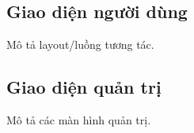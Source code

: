 
\subsection{Giao diện người dùng}
Mô tả layout/luồng tương tác.

\subsection{Giao diện quản trị}
Mô tả các màn hình quản trị.
